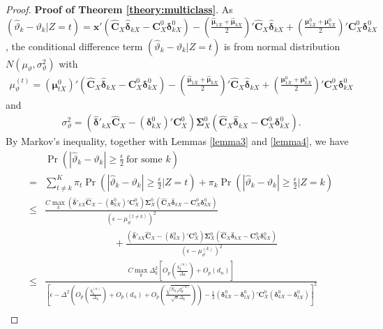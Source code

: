 \documentclass[12pt]{article}
\begin{document}
\begin{proof}{\textbf{Proof of Theorem \ref{theory:multiclass}}.}{}
As $(\hat{\vartheta}_k - \vartheta_k | Z = t) = \bm x' (\hat{\bm C}_X \hat{\bm \delta}_{kX} - \bm C_X^0 \bm \delta_{kX}^0) - (\frac{\hat{\bm \mu}_{1X} + \hat{\bm \mu}_{kX}}{2})' \hat{\bm C}_X \hat{\bm \delta}_{kX} + (\frac{\bm \mu_{1X}^0 + \bm \mu_{kX}^0}{2})' \bm C_X^0 \bm \delta_{kX}^0$, the conditional difference term
$(\hat{\vartheta}_k - \vartheta_k | Z = t)$ is from normal distribution $N( \mu_{\vartheta}, \sigma^2_{\vartheta})$ with
\begin{align*}
\mu_{\vartheta}^{(t)} = (\bm \mu_{tX}^{0})' (\hat{\bm C}_X \hat{\bm \delta}_{kX} - \bm C_X^0 \bm \delta_{kX}^0) - (\frac{\hat{\bm \mu}_{1X} + \hat{\bm \mu}_{kX}}{2})' \hat{\bm C}_X \hat{\bm \delta}_{kX} + (\frac{\bm \mu_{1X}^0 + \bm \mu_{kX}^0}{2})' \bm C_X^0 \bm \delta_{kX}^0
\end{align*}
and
\begin{align*}
\sigma^2_{\vartheta} = (\hat{\bm \delta}'_{kX} \hat{\bm C}_X - (\bm \delta_{kX}^0)' \bm C_X^0) \bm \Sigma_X^0 (\hat{\bm C}_X \hat{\bm \delta}_{kX} - \bm C_X^0 \bm \delta_{kX}^0).
\end{align*}
By Markov's inequality, together with Lemmas \ref{lemma3} and \ref{lemma4}, we have
\begin{align}\label{eq:7}
& \Pr(|\hat{\vartheta}_k - \vartheta_k| \geq \frac{\epsilon}{2}~ \mbox{for some } k) \nonumber \\
= & \sum_{t \neq k}^K \pi_t \Pr(|\hat{\vartheta}_k - \vartheta_k| \geq \frac{\epsilon}{2} | Z = t) + \pi_k \Pr(|\hat{\vartheta}_k - \vartheta_k| \geq \frac{\epsilon}{2} | Z = k) \nonumber \\
\leq & \frac{C \max\limits_k (\hat{\bm \delta}'_{kX} \hat{\bm C}_X - (\bm \delta_{kX}^0)' \bm C_X^0) \bm \Sigma_X^0 (\hat{\bm C}_X \hat{\bm \delta}_{kX} - \bm C_X^0 \bm \delta_{kX}^0)}{(\epsilon - \mu_{\vartheta}^{(t \neq k)})^2} \nonumber \\
& ~~~~~~~~~~~~~~~~~~~~~~~~~~~~~~~~ + \frac{(\hat{\bm \delta}'_{kX} \hat{\bm C}_X - (\bm \delta_{kX}^0)' \bm C_X^0) \bm \Sigma_X^0 (\hat{\bm C}_X \hat{\bm \delta}_{kX} - \bm C_X^0 \bm \delta_{kX}^0)}{(\epsilon - \mu_{\vartheta}^{(k)})^2}    \nonumber    \\
\leq & \frac{C \max\limits_k \Delta_k^2 [ O_p(\frac{b_k^{(n)}}{\Delta_k}) + O_p(d_n) ]}{\left[\epsilon - \Delta^2 ( O_p(\frac{b_k^{(n)}}{\Delta_k}) + O_p(d_n) + O_p(\frac{\sqrt{S_{h;p} q_k^{(n)}}}{\sqrt{n} \Delta_k}) ) - \frac{1}{2} (\bm \delta_{kX}^0 - \bm \delta_{tX}^0)' \bm C_X^0 (\bm \delta_{kX}^0 - \bm \delta_{tX}^0) \right]^2} \nonumber   \\

\end{align}
\end{proof}
\end{document}
